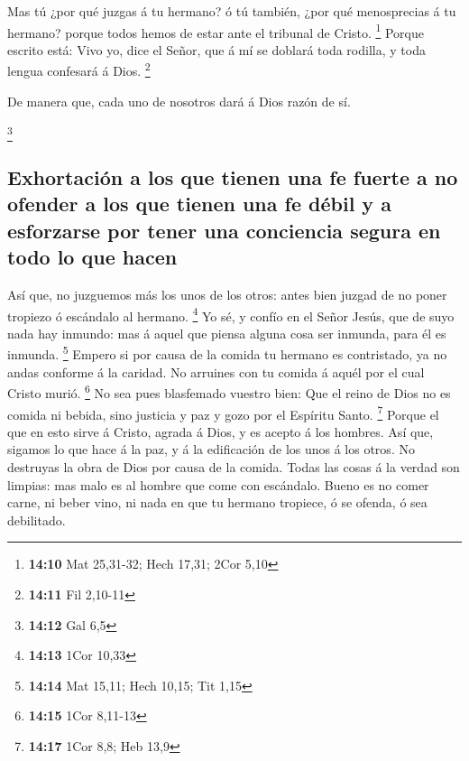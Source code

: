  Mas tú ¿por qué juzgas á tu hermano? ó tú también, ¿por
qué menosprecias á tu hermano? porque todos hemos de estar ante el
tribunal de Cristo. \footnote{\textbf{14:10} Mat 25,31-32; Hech 17,31;
  2Cor 5,10}  Porque escrito está: Vivo yo, dice el
Señor, que á mí se doblará toda rodilla, y toda lengua confesará á Dios.
\footnote{\textbf{14:11} Fil 2,10-11}

 De manera que, cada uno de nosotros dará á Dios razón de
sí.

\footnote{\textbf{14:12} Gal 6,5}

\hypertarget{exhortaciuxf3n-a-los-que-tienen-una-fe-fuerte-a-no-ofender-a-los-que-tienen-una-fe-duxe9bil-y-a-esforzarse-por-tener-una-conciencia-segura-en-todo-lo-que-hacen}{%
\subsection{Exhortación a los que tienen una fe fuerte a no ofender a
los que tienen una fe débil y a esforzarse por tener una conciencia
segura en todo lo que
hacen}\label{exhortaciuxf3n-a-los-que-tienen-una-fe-fuerte-a-no-ofender-a-los-que-tienen-una-fe-duxe9bil-y-a-esforzarse-por-tener-una-conciencia-segura-en-todo-lo-que-hacen}}

 Así que, no juzguemos más los unos de los otros: antes
bien juzgad de no poner tropiezo ó escándalo al hermano. \footnote{\textbf{14:13}
  1Cor 10,33}  Yo sé, y confío en el Señor Jesús, que de
suyo nada hay inmundo: mas á aquel que piensa alguna cosa ser inmunda,
para él es inmunda. \footnote{\textbf{14:14} Mat 15,11; Hech 10,15; Tit
  1,15}  Empero si por causa de la comida tu hermano es
contristado, ya no andas conforme á la caridad. No arruines con tu
comida á aquél por el cual Cristo murió. \footnote{\textbf{14:15} 1Cor
  8,11-13}  No sea pues blasfemado vuestro bien:
 Que el reino de Dios no es comida ni bebida, sino
justicia y paz y gozo por el Espíritu Santo. \footnote{\textbf{14:17}
  1Cor 8,8; Heb 13,9}  Porque el que en esto sirve á
Cristo, agrada á Dios, y es acepto á los hombres.  Así
que, sigamos lo que hace á la paz, y á la edificación de los unos á los
otros.  No destruyas la obra de Dios por causa de la
comida. Todas las cosas á la verdad son limpias: mas malo es al hombre
que come con escándalo.  Bueno es no comer carne, ni
beber vino, ni nada en que tu hermano tropiece, ó se ofenda, ó sea
debilitado.

